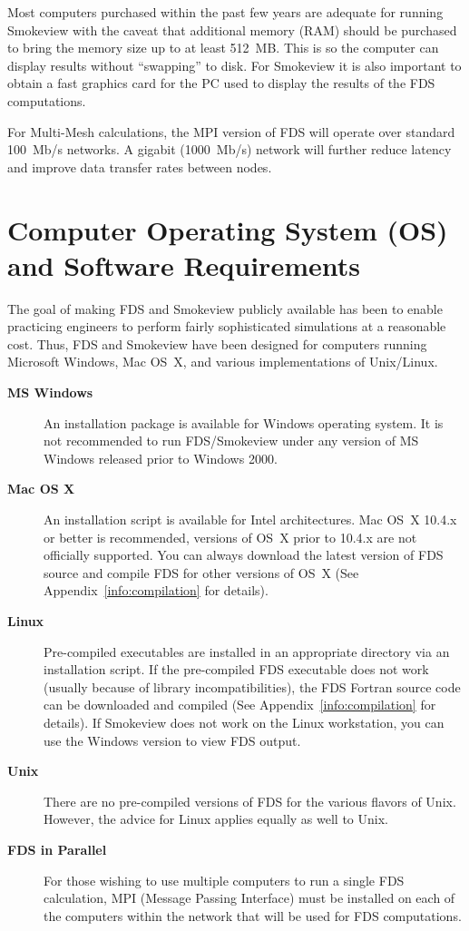 \documentclass[11pt]{book}
\begin{document}
Most computers purchased within the past few years are adequate for running Smokeview with the caveat that additional memory (RAM) should be purchased to bring the memory size up to at least 512~MB. This is so the computer can display results without ``swapping'' to disk. For Smokeview it is also important to obtain a fast graphics card for the PC used to display the results of the FDS computations.

For Multi-Mesh calculations, the MPI version of FDS will operate over standard 100~Mb/s networks. A gigabit (1000~Mb/s) network will further reduce latency and improve data transfer rates between nodes.


\section{Computer Operating System (OS) and Software Requirements}

The goal of making FDS and Smokeview publicly available has been to enable practicing engineers to perform fairly sophisticated simulations at a reasonable cost. Thus, FDS and Smokeview have been
designed for computers running Microsoft Windows, Mac OS~X, and various implementations of Unix/Linux.
\begin{description}
\item[{\bf MS Windows}] An installation package is available for Windows operating system. It is not recommended to run FDS/Smokeview under any version of MS Windows released prior to Windows 2000.
\item[{\bf Mac OS X}] An installation script is available for Intel architectures. Mac OS~X 10.4.x or better is recommended, versions of OS~X prior to 10.4.x are not officially supported. You can always download the latest version of FDS source and compile FDS for other versions of OS~X (See Appendix~\ref{info:compilation} for details).
\item[{\bf Linux}] Pre-compiled executables are installed in an appropriate directory via an installation script. If the pre-compiled FDS executable does not work (usually because of library incompatibilities), the FDS Fortran source code can be downloaded and compiled (See Appendix~\ref{info:compilation} for details). If Smokeview does not work on the Linux workstation, you can use the Windows version to view FDS output.
\item[{\bf Unix}] There are no pre-compiled versions of FDS for the various flavors of Unix. However, the advice for Linux applies equally as well to Unix.
\item[{\bf FDS in Parallel}] For those wishing to use multiple computers to run a single FDS calculation, MPI (Message Passing Interface) must be installed on each of the computers within the network that will be used for FDS computations.
\end{description}
\end{document}
